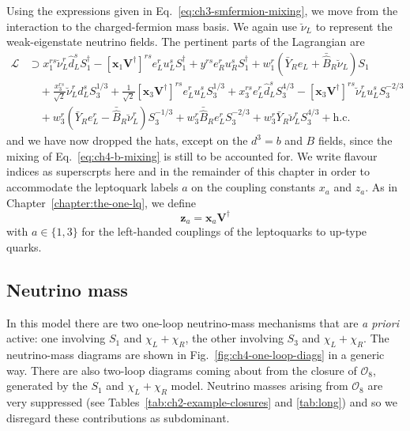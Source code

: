 Using the expressions given in Eq.~\eqref{eq:ch3-smfermion-mixing}, we move from
the interaction to the charged-fermion mass basis. We again use $\breve{\nu}_{L}$ to
represent the weak-eigenstate neutrino fields. The pertinent parts of the
Lagrangian are
\begin{equation}
  \begin{split}
    \label{eq:ch4-lag-y}
    \mathscr{L} &\supset x_{1}^{rs} \breve{\nu}_L^r \hat{d}_L^s S_{1}^\dagger - [\mathbf{x}_{1} \mathbf{V}^\dagger]^{rs} e_L^r u_L^s S_{1}^\dagger + y^{rs} e_R^r u_R^s S^{\dagger}_{1} + w^{r}_{1} (\bar{Y}_{R} e_{L} + \bar{\hat{B}}_{R} \breve{\nu}_{L}) S_{1} \\
    &\quad + \frac{x^{rs}_{3}}{\sqrt{2}} \breve{\nu}^{r}_{L} d^{s}_{L} S_{3}^{1/3} + \frac{1}{\sqrt{2}} [\mathbf{x}_{3} \mathbf{V}^\dagger]^{rs} e^{r}_{L} u^{s}_{L} S_{3}^{1/3} + x^{rs}_{3} e^{r}_{L} \hat{d}^{s}_{L} S^{4/3}_{3} - [\mathbf{x}_{3} \mathbf{V}^\dagger]^{rs} \breve{\nu}^{r}_{L} u^{s}_{L} S^{-2/3}_{3} \\
    &\quad + w^{r}_{3} (\bar{Y}_{R} e^{r}_{L} - \bar{\hat{B}}_{R} \breve{\nu}^{r}_{L}) S^{-1/3}_{3} +  w^{r}_{3} \bar{\hat{B}}_{R} e^{r}_{L} S^{-2/3}_{3} + w^{r}_{3} \bar{Y}_{R} \breve{\nu}^{r}_{L}S^{4/3}_{3} + \text{h.c.}
  \end{split}
\end{equation}
and we have now dropped the hats, except on the $d^{3} = b$ and $B$ fields,
since the mixing of Eq.~\eqref{eq:ch4-b-mixing} is still to be accounted for. We
write flavour indices as superscrpts here and in the remainder of this chapter
in order to accommodate the leptoquark labels $a$ on the coupling constants
$x_{a}$ and $z_{a}$. As in Chapter~\ref{chapter:the-one-lq}, we define
\begin{equation}
  \label{eq:ch4-z-relation}
  \mathbf{z}_{a} = \mathbf{x}_{a} \mathbf{V}^{\dagger}
\end{equation}
with $a \in \{1, 3\}$ for the left-handed couplings of the leptoquarks to
up-type quarks.

\subsection{Neutrino mass}
\label{sec:ch4-innes-neutrino-mass}

In this model there are two one-loop neutrino-mass mechanisms that are \textit{a
  priori} active: one involving $S_{1}$ and $\chi_{L} + \chi_{R}$, the other
involving $S_{3}$ and $\chi_{L} + \chi_{R}$. The neutrino-mass diagrams are
shown in Fig.~\ref{fig:ch4-one-loop-diags} in a generic way. There are also
two-loop diagrams coming about from the closure of $\mathcal{O}_{8}$, generated
by the $S_{1}$ and $\chi_{L} + \chi_{R}$ model. Neutrino masses arising from
$\mathcal{O}_{8}$ are very suppressed (see Tables~\ref{tab:ch2-example-closures}
and \ref{tab:long}) and so we disregard these contributions as subdominant.

